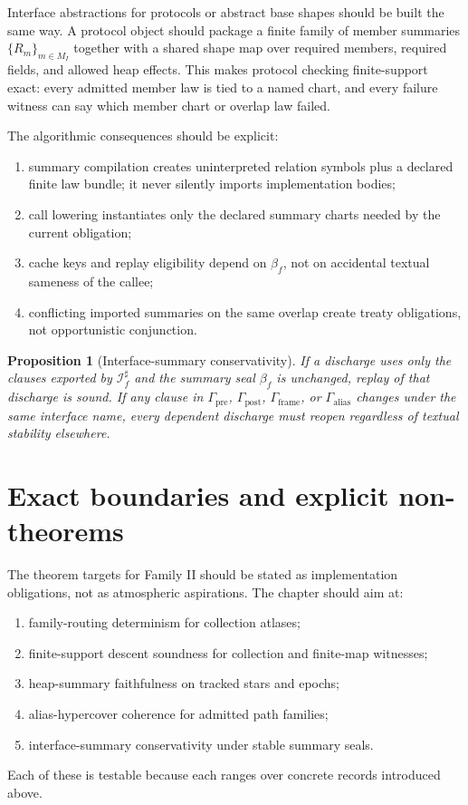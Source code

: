\documentclass[11pt]{report}
\newtheorem{proposition}[definition]{Proposition}
\begin{document}
Interface abstractions for protocols or abstract base shapes should be built the same way. A protocol object should package a finite family of member summaries $\{R_m\}_{m\in M_I}$ together with a shared shape map over required members, required fields, and allowed heap effects. This makes protocol checking finite-support exact: every admitted member law is tied to a named chart, and every failure witness can say which member chart or overlap law failed.

The algorithmic consequences should be explicit:
\begin{enumerate}
\item summary compilation creates uninterpreted relation symbols plus a declared finite law bundle; it never silently imports implementation bodies;
\item call lowering instantiates only the declared summary charts needed by the current obligation;
\item cache keys and replay eligibility depend on $\beta_f$, not on accidental textual sameness of the callee;
\item conflicting imported summaries on the same overlap create treaty obligations, not opportunistic conjunction.
\end{enumerate}

\begin{proposition}[Interface-summary conservativity]
If a discharge uses only the clauses exported by $\mathcal{I}^{\sharp}_{f}$ and the summary seal $\beta_f$ is unchanged, replay of that discharge is sound. If any clause in $\Gamma_{\mathrm{pre}}$, $\Gamma_{\mathrm{post}}$, $\Gamma_{\mathrm{frame}}$, or $\Gamma_{\mathrm{alias}}$ changes under the same interface name, every dependent discharge must reopen regardless of textual stability elsewhere.
\end{proposition}

\section{Exact boundaries and explicit non-theorems}
The theorem targets for Family II should be stated as implementation obligations, not as atmospheric aspirations. The chapter should aim at:
\begin{enumerate}
\item family-routing determinism for collection atlases;
\item finite-support descent soundness for collection and finite-map witnesses;
\item heap-summary faithfulness on tracked stars and epochs;
\item alias-hypercover coherence for admitted path families;
\item interface-summary conservativity under stable summary seals.
\end{enumerate}
Each of these is testable because each ranges over concrete records introduced above.
\end{document}
